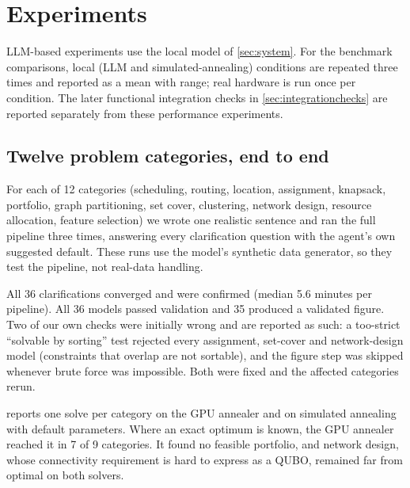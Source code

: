 \section{Experiments}
\label{sec:experiments}

LLM-based experiments use the local model of \cref{sec:system}. For the benchmark comparisons, local
(LLM and simulated-annealing) conditions are repeated three times and reported as a mean with range;
real hardware is run once per condition. The later functional integration checks in
\cref{sec:integrationchecks} are reported separately from these performance experiments.

\subsection{Twelve problem categories, end to end}
\label{sec:suite}
For each of 12 categories (scheduling, routing, location, assignment, knapsack, portfolio, graph partitioning,
set cover, clustering, network design, resource allocation, feature selection) we wrote one realistic sentence and
ran the full pipeline three times, answering every clarification question with the agent's own suggested default.
These runs use the model's synthetic data generator, so they test the pipeline, not real-data handling.

All 36 clarifications converged and were confirmed (median 5.6 minutes per pipeline). All 36 models passed
validation and 35 produced a validated figure. Two of our own checks were initially wrong and are reported as
such: a too-strict ``solvable by sorting'' test rejected every assignment, set-cover and network-design model
(constraints that overlap are not sortable), and the figure step was skipped whenever brute force was impossible.
Both were fixed and the affected categories rerun.

 reports one solve per category on the GPU annealer and on simulated annealing with default
parameters. Where an exact optimum is known, the GPU annealer reached it in 7 of 9 categories. It found no feasible
portfolio, and network design, whose connectivity requirement is hard to express as a QUBO, remained far from
optimal on both solvers.

